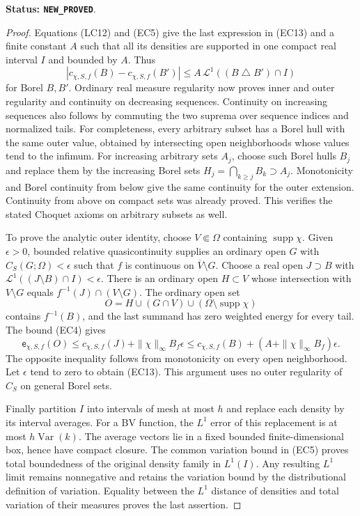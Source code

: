 \noindent\textbf{Status: \texttt{NEW\_PROVED}}.

\begin{proof}
Equations (LC12) and (EC5) give the last expression in (EC13)
and a finite constant $A$ such that all its densities are supported
in one compact real interval $I$ and bounded by $A$.  Thus
\[
 |c_{\chi,S,f}(B)-c_{\chi,S,f}(B')|
                 \le A\,\mathcal L^1((B\mathbin\triangle B')\cap I)
 \tag{EC14}
\]
for Borel $B,B'$.  Ordinary real measure regularity now proves
inner and outer regularity and continuity on decreasing sequences.
Continuity on increasing sequences also follows by commuting the
two suprema over sequence indices and normalized tails.
For completeness, every arbitrary subset has a Borel hull with
the same outer value, obtained by intersecting open neighborhoods
whose values tend to the infimum.  For increasing arbitrary sets
$A_j$, choose such Borel hulls $B_j$ and replace them by the
increasing Borel sets $H_j=\bigcap_{k\geq j}B_k\supset A_j$.
Monotonicity and Borel continuity from below give the same
continuity for the outer extension.  Continuity from above on
compact sets was already proved.  This verifies the stated
Choquet axioms on arbitrary subsets as well.

To prove the analytic outer identity, choose $V\Subset\Omega$
containing $\operatorname{supp}\chi$.  Given $\epsilon>0$,
bounded relative quasicontinuity supplies an ordinary open $G$
with $C_S(G;\Omega)<\epsilon$ such that $f$ is continuous on
$\overline V\setminus G$.  Choose a real open $J\supset B$
with $\mathcal L^1((J\setminus B)\cap I)<\epsilon$.
There is an ordinary open $H\subset V$ whose intersection
with $V\setminus G$ equals $f^{-1}(J)\cap(V\setminus G)$.
The ordinary open set
\[
 O=H\cup(G\cap V)\cup(\Omega\setminus\operatorname{supp}\chi)
\]
contains $f^{-1}(B)$, and the last summand has zero weighted
energy for every tail.  The bound (EC4) gives
\[
 \mathsf e_{\chi,S,f}(O)
 \le c_{\chi,S,f}(J)
          +\|\chi\|_\infty B_f\epsilon
 \le c_{\chi,S,f}(B)
          +(A+\|\chi\|_\infty B_f)\epsilon.
\]
The opposite inequality follows from monotonicity on every
open neighborhood.  Let $\epsilon$ tend to zero to obtain
(EC13).  This argument uses no outer regularity of $C_S$ on
general Borel sets.

Finally partition $I$ into intervals of mesh at most $h$ and
replace each density by its interval averages.  For a BV
function, the $L^1$ error of this replacement is at most
$h\operatorname{Var}(k)$.  The average vectors lie in a fixed
bounded finite-dimensional box, hence have compact closure.
The common variation bound in (EC5) proves total boundedness
of the original density family in $L^1(I)$.  Any resulting
$L^1$ limit remains nonnegative and retains the variation bound
by the distributional definition of variation.  Equality between
the $L^1$ distance of densities and total variation of their
measures proves the last assertion.
\end{proof}

